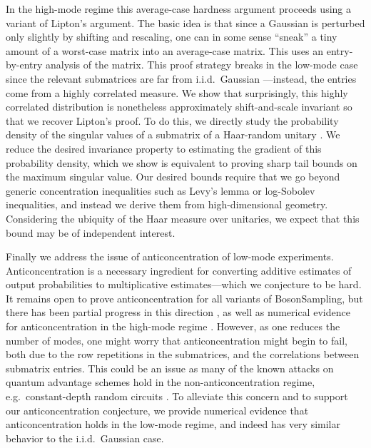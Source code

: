 \documentclass[11pt]{article}
\theoremstyle{plain}
\theoremstyle{plain}
\theoremstyle{plain}
\theoremstyle{plain}
\theoremstyle{plain}
\theoremstyle{plain}
\theoremstyle{plain}
\theoremstyle{remark}
\theoremstyle{remark}
\theoremstyle{plain}
\theoremstyle{plain}
\theoremstyle{plain}
\theoremstyle{plain}
\begin{document}
In the high-mode regime this average-case hardness argument proceeds using a variant of Lipton's argument.
The basic idea is that since a Gaussian is perturbed only slightly by shifting and rescaling, one can in some sense ``sneak'' a tiny amount of a worst-case matrix into an average-case matrix. This uses an entry-by-entry analysis of the matrix. This proof strategy breaks in the low-mode case since the relevant submatrices are far from i.i.d.\ Gaussian \cite{jiang2006many}---instead, the entries come from a highly correlated measure.
We show that surprisingly, this highly correlated distribution is nonetheless approximately shift-and-scale invariant so that we recover Lipton's proof. To do this, we directly study the probability density of the singular values of a submatrix of a Haar-random unitary \cite{collins2003integrales,reffy}.
We reduce the desired invariance property to estimating the gradient of this probability density, which we show is equivalent to proving sharp tail bounds on the maximum singular value. Our desired bounds require that we go beyond generic concentration inequalities such as Levy's lemma or log-Sobolev inequalities, and instead we derive them from high-dimensional geometry. Considering the ubiquity of the Haar measure over unitaries, we expect that this bound may be of independent interest.

Finally we address the issue of anticoncentration of low-mode experiments. Anticoncentration is a necessary ingredient for converting additive estimates of output probabilities to multiplicative estimates---which we conjecture to be hard. It remains open to prove anticoncentration for all variants of BosonSampling, but there has been partial progress in this direction \cite{nezami2021permanent}, as well as  numerical evidence for anticoncentration in the high-mode regime \cite{Aaronson2013}. However, as one reduces the number of modes, one might worry that anticoncentration might begin to fail, both due to the row repetitions in the submatrices, and the correlations between submatrix entries. This could be an issue as many of the known attacks on quantum advantage schemes hold in the non-anticoncentration regime, e.g.\ constant-depth random circuits \cite{Napp2020}. To alleviate this concern and to support our anticoncentration conjecture, we provide numerical evidence that anticoncentration holds in the low-mode regime, and indeed has very similar behavior to the i.i.d.\  Gaussian case. 
\end{document}
